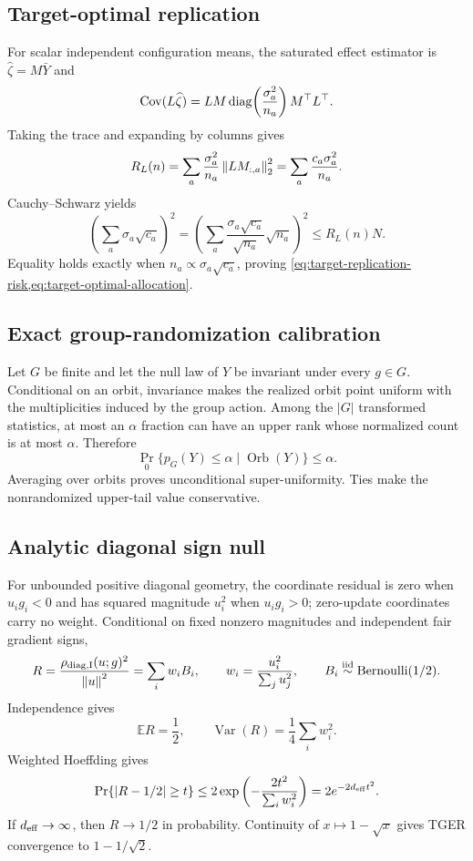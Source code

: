 \subsection{Target-optimal replication}

For scalar independent configuration means, the saturated effect estimator is
$\widehat\zeta=M\bar Y$ and
\[
\operatorname{Cov}(L\widehat\zeta)
=L M\operatorname{diag}\!\left(\frac{\sigma_a^2}{n_a}\right)M^\top L^\top.
\]
Taking the trace and expanding by columns gives
\[
R_L(n)
=\sum_a\frac{\sigma_a^2}{n_a}\left\lVert LM_{:,a}\right\rVert_2^2
=\sum_a\frac{c_a\sigma_a^2}{n_a}.
\]
Cauchy--Schwarz yields
\[
\left(\sum_a\sigma_a\sqrt{c_a}\right)^2
=\left(\sum_a
\frac{\sigma_a\sqrt{c_a}}{\sqrt{n_a}}\sqrt{n_a}\right)^2
\le R_L(n)N.
\]
Equality holds exactly when
$n_a\propto\sigma_a\sqrt{c_a}$, proving
\cref{eq:target-replication-risk,eq:target-optimal-allocation}.

\subsection{Exact group-randomization calibration}

Let $G$ be finite and let the null law of $Y$ be invariant under every
$g\in G$.  Conditional on an orbit, invariance makes the realized orbit point
uniform with the multiplicities induced by the group action.  Among the
$|G|$ transformed statistics, at most an $\alpha$ fraction can have an upper
rank whose normalized count is at most $\alpha$.  Therefore
\[
\Pr_0\{p_G(Y)\le\alpha\mid\operatorname{Orb}(Y)\}\le\alpha.
\]
Averaging over orbits proves unconditional super-uniformity.  Ties make the
nonrandomized upper-tail value conservative.

\subsection{Analytic diagonal sign null}

For unbounded positive diagonal geometry, the coordinate residual is zero
when $u_ig_i<0$ and has squared magnitude $u_i^2$ when $u_ig_i>0$; zero-update
coordinates carry no weight.  Conditional on fixed nonzero magnitudes and
independent fair gradient signs,
\[
R=\frac{\rho_{\rm diag,I}(u;g)^2}{\left\lVert u\right\rVert^2}
=\sum_iw_iB_i,
\qquad
w_i=\frac{u_i^2}{\sum_j u_j^2},
\qquad
B_i\stackrel{\rm iid}{\sim}\operatorname{Bernoulli}(1/2).
\]
Independence gives
\[
\mathbb ER=\frac12,
\qquad
\operatorname{Var}(R)=\frac14\sum_iw_i^2.
\]
Weighted Hoeffding gives
\[
\Pr\{|R-1/2|\ge t\}
\le2\exp\left(-\frac{2t^2}{\sum_iw_i^2}\right)
=2e^{-2d_{\rm eff}t^2}.
\]
If $d_{\rm eff}\to\infty$, then $R\to1/2$ in probability.  Continuity of
$x\mapsto1-\sqrt x$ gives TGER convergence to $1-1/\sqrt2$.
